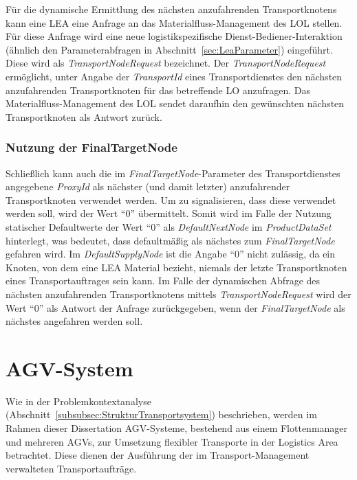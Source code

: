 Für die dynamische Ermittlung des nächsten anzufahrenden Transportknotens kann eine LEA eine Anfrage an das Materialfluss-Management des LOL stellen. Für diese Anfrage wird eine neue logistikspezifische Dienst-Bediener-Interaktion (ähnlich den Parameterabfragen in Abschnitt~\ref{sec:LeaParameter}) eingeführt. Diese wird als \emph{TransportNodeRequest} bezeichnet. Der \emph{TransportNodeRequest} ermöglicht, unter Angabe der \emph{TransportId} eines Transportdienstes den nächsten anzufahrenden Transportknoten für das betreffende LO anzufragen. Das Materialfluss-Management des LOL sendet daraufhin den gewünschten nächsten Transportknoten als Antwort zurück. 

\subsubsection{Nutzung der FinalTargetNode}

Schließlich kann auch die im \emph{FinalTargetNode}-Parameter des Transportdienstes angegebene \emph{ProxyId} als nächster (und damit letzter) anzufahrender Transportknoten verwendet werden. Um zu signalisieren, dass diese verwendet werden soll, wird der Wert \enquote{0} übermittelt. Somit wird im Falle der Nutzung statischer Defaultwerte der Wert \enquote{0} als \emph{DefaultNextNode} im \emph{ProductDataSet} hinterlegt, was bedeutet, dass defaultmäßig als nächstes zum \emph{FinalTargetNode} gefahren wird. Im \emph{DefaultSupplyNode} ist die Angabe \enquote{0} nicht zulässig, da ein Knoten, von dem eine LEA Material bezieht, niemals der letzte Transportknoten eines Transportauftrages sein kann. Im Falle der dynamischen Abfrage des nächsten anzufahrenden Transportknotens mittels \emph{TransportNodeRequest} wird der Wert \enquote{0} als Antwort der Anfrage zurückgegeben, wenn der \emph{FinalTargetNode} als nächstes angefahren werden soll.


\section{AGV-System}
\label{sec:AgvSystemLA}

Wie in der Problemkontextanalyse (Abschnitt~\ref{subsubsec:StrukturTransportsystem}) beschrieben, werden im Rahmen dieser Dissertation AGV-Systeme, bestehend aus einem Flottenmanager und mehreren AGVs, zur Umsetzung flexibler Transporte in der Logistics Area betrachtet. Diese dienen der Ausführung der im Transport-Management verwalteten Transportaufträge. 

